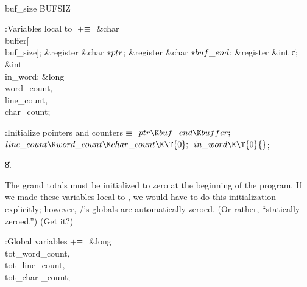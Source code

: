 \Y\B\4\D\\{buf\_size}\5
\.{BUFSIZ}\par
\Y\B\4:Variables local to \X${}\mathrel+\equiv{}$\6
\&{char} \\{buffer}[\\{buf\_size}];\6
\&{register} \&{char} ${}{*}\\{ptr}{}$;\6
\&{register} \&{char} ${}{*}\\{buf\_end}{}$;\6
\&{register} \&{int} \|c;\6
\&{int} \\{in\_word};\6
\&{long} \\{word\_count}${},{}$ \\{line\_count}${},{}$ \\{char\_count};\par
\fi

\B{}:Initialize pointers and counters\X${}\equiv{}$\6
$\\{ptr}\K\\{buf\_end}\K\\{buffer};{}$\6
${}\\{line\_count}\K\\{word\_count}\K\\{char\_count}\K\T{0};{}$\6
${}\\{in\_word}\K\T{0}{}$;\par
\U8.\fi

The grand totals must be initialized to zero at the beginning of the
program. If we made these variables local to , we would have to
do this initialization explicitly; however, \CEE/'s globals are automatically
zeroed. (Or rather, ``statically zeroed.'') (Get it?)

\Y\B\4:Global variables\X${}\mathrel+\equiv{}$\6
\&{long} \\{tot\_word\_count}${},{}$ \\{tot\_line\_count}${},{}$ \\{tot\_char%
\_count};\par
\fi

